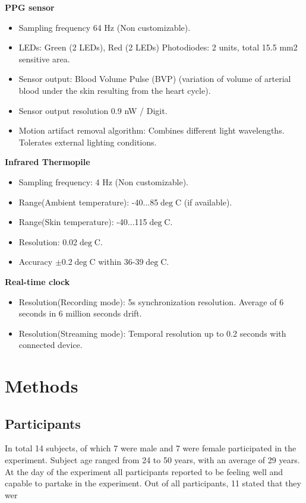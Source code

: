 \textbf{PPG sensor}
\begin{itemize}
\item Sampling frequency 64 Hz (Non customizable).
\item LEDs: Green (2 LEDs), Red (2 LEDs) Photodiodes: 2
units, total 15.5 mm2 sensitive area.
\item Sensor output: Blood Volume Pulse (BVP) (variation
of volume of arterial blood under the skin resulting
from the heart cycle).
\item Sensor output resolution 0.9 nW / Digit.
\item Motion artifact removal algorithm: Combines different light wavelengths. Tolerates external lighting conditions.
\end{itemize}

\textbf{Infrared Thermopile}
\begin{itemize}
\item Sampling frequency: 4 Hz (Non customizable).
\item Range(Ambient temperature): -40...85$\deg$C (if available).
\item Range(Skin temperature): -40...115$\deg$C.
\item Resolution: 0.02$\deg$C.
\item Accuracy $\pm$0.2$\deg$C within 36-39$\deg$C.
\end{itemize}

\textbf{Real-time clock}
\begin{itemize}
\item Resolution(Recording mode): 5s synchronization resolution. Average of 6 seconds in 6 million seconds drift.
\item Resolution(Streaming mode): Temporal resolution up to 0.2 seconds with connected device.
\end{itemize}

\section{Methods}
\subsection{Participants}
In total 14 subjects, of which 7 were male and 7 were female participated in the experiment. Subject age ranged from 24 to 50 years, with an average of 29 years. At the day of the experiment all participants reported to be feeling well and capable to partake in the experiment. Out of all participants, 11 stated that they wer
